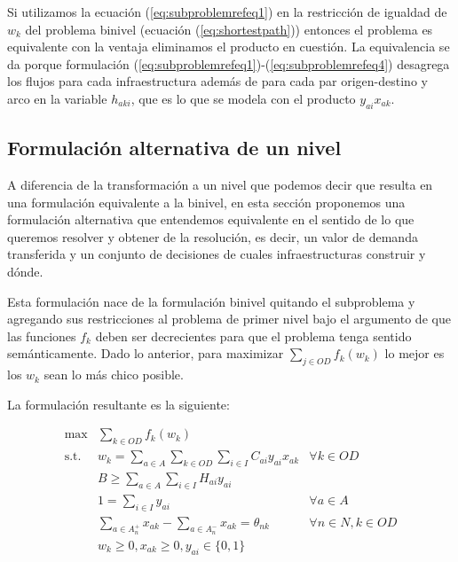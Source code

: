 \documentclass{article}
\begin{document}
  Si utilizamos la ecuación (\ref{eq:subproblemrefeq1}) en la restricción de igualdad de $w_k$ del problema binivel (ecuación (\ref{eq:shortestpath})) entonces el problema es equivalente con la ventaja eliminamos el producto en cuestión. La equivalencia se da porque formulación (\ref{eq:subproblemrefeq1})-(\ref{eq:subproblemrefeq4}) desagrega los flujos para cada infraestructura además de para cada par origen-destino y arco en la variable $h_{aki}$, que es lo que se modela con el producto $y_{ai} x_{ak}$.

  \subsection{Formulación alternativa de un nivel}
  \label{altOneLevelFormulation}

  A diferencia de la transformación a un nivel que podemos decir que resulta en una formulación equivalente a la binivel, en esta sección proponemos una formulación alternativa que entendemos equivalente en el sentido de lo que queremos resolver y obtener de la resolución, es decir, un valor de demanda transferida y un conjunto de decisiones de cuales infraestructuras construir y dónde.

  Esta formulación nace de la formulación binivel quitando el subproblema y agregando sus restricciones al problema de primer nivel bajo el argumento de que las funciones $f_k$ deben ser decrecientes para que el problema tenga sentido semánticamente. Dado lo anterior, para maximizar $\sum_{j \in OD}f_k(w_k)$ lo mejor es los $w_k$ sean lo más chico posible.

  La formulación resultante es la siguiente:

  \begin{align}
    \text{max}    & \sum_{k \in OD} f_k(w_k)                                                         & \label{eq:objectivealt} \\
    \text{s.t.}\; & w_k = \sum_{a \in A} \sum_{k \in OD} \sum_{i \in I} C_{ai}y_{ai}x_{ak}           & \forall k \in OD \label{eq:shortestpathalt} \\
                  & B \geq \sum_{a \in A} \sum_{i \in I} H_{ai}y_{ai}                                & \label{eq:respectbudgetalt} \\
                  & 1 = \sum_{i \in I} y_{ai}                                                        & \forall a \in A \label{eq:alwaysoneyalt} \\
                  & \sum_{a \in A_n^+} x_{ak} - \sum_{a \in A_n^-} x_{ak} = \theta_{nk}              & \forall n \in N, k \in OD \label{eq:flowbalancealt} \\
                  & w_k \geq 0, x_{ak} \geq 0, y_{ai} \in \{0,1\}                                    & \nonumber
  \end{align}
\end{document}
